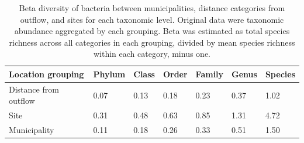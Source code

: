 \documentclass[letterpaper,12pt]{article}\usepackage[]{graphicx}\usepackage[]{color}
\begin{document}
\begin{table}[!tbp]
\caption{Beta diversity of bacteria between municipalities, distance categories from outflow, and sites for each taxonomic level.  Original data were taxonomic abundance aggregated by each grouping.  Beta was estimated as total species richness across all categories in each grouping, divided by mean species richness within each category, minus one.\label{tab:beta_bac}} 
\begin{center}
\begin{tabular}{lllllll}
\hline\hline
\multicolumn{1}{l}{Location grouping}&\multicolumn{1}{c}{Phylum}&\multicolumn{1}{c}{Class}&\multicolumn{1}{c}{Order}&\multicolumn{1}{c}{Family}&\multicolumn{1}{c}{Genus}&\multicolumn{1}{c}{Species}\tabularnewline
\hline
Distance from outflow&0.07&0.13&0.18&0.23&0.37&1.02\tabularnewline
Site&0.31&0.48&0.63&0.85&1.31&4.72\tabularnewline
Municipality&0.11&0.18&0.26&0.33&0.51&1.50\tabularnewline
\hline
\end{tabular}\end{center}
\end{table}
\end{document}
